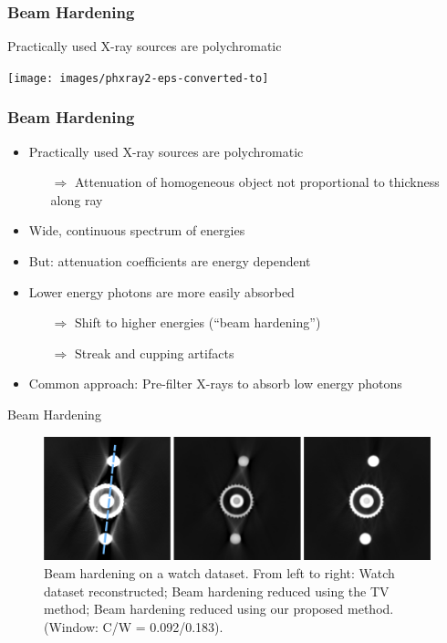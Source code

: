 \begin{frame}
	\frametitle{Beam Hardening}
	Practically used X-ray sources are polychromatic
 	\begin{center}\texttt{[image: images/phxray2-eps-converted-to]}\end{center}
\end{frame}

\begin{frame}
	\frametitle{Beam Hardening}

	\begin{itemize}
		\setlength\itemsep{0.3cm}
		\item Practically used X-ray sources are polychromatic
		      \begin{itemize}
			      \item[$\Rightarrow$] Attenuation of homogeneous object not proportional to thickness along ray
		      \end{itemize}
		\item Wide, continuous spectrum of energies
		\item But: attenuation coefficients are energy dependent
		\item Lower energy photons are more easily absorbed
		      \begin{itemize}
			      \item[$\Rightarrow$] Shift to higher energies (``beam hardening'')
			      \item[$\Rightarrow$] Streak and cupping artifacts
		      \end{itemize}
		\item Common approach: Pre-filter X-rays to absorb low energy photons
	\end{itemize}

\end{frame}

\begin{frame}[t]{Beam Hardening}
	\begin{figure}[htpb]
		\centering
		\includegraphics[height=0.6\textheight]{images/beam_hardening.png}
		\caption{Beam hardening on a watch dataset. From left to right: Watch dataset reconstructed; Beam hardening reduced using the TV method; Beam hardening reduced using our proposed method. (Window: C/W = 0.092/0.183).}%
	\end{figure}
	\flushright{}
	\tiny
\end{frame}

